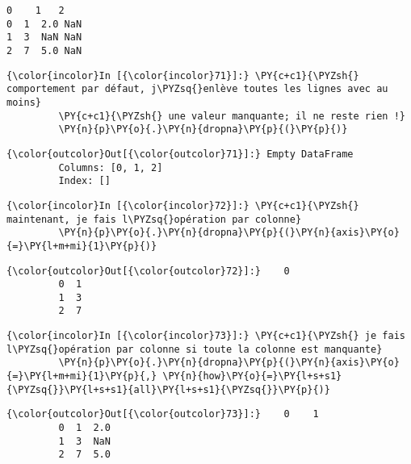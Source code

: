     \begin{Verbatim}[commandchars=\\\{\}]
   0    1   2
0  1  2.0 NaN
1  3  NaN NaN
2  7  5.0 NaN

    \end{Verbatim}

    \begin{Verbatim}[commandchars=\\\{\}]
{\color{incolor}In [{\color{incolor}71}]:} \PY{c+c1}{\PYZsh{} comportement par défaut, j\PYZsq{}enlève toutes les lignes avec au moins}
         \PY{c+c1}{\PYZsh{} une valeur manquante; il ne reste rien !}
         \PY{n}{p}\PY{o}{.}\PY{n}{dropna}\PY{p}{(}\PY{p}{)}
\end{Verbatim}


\begin{Verbatim}[commandchars=\\\{\}]
{\color{outcolor}Out[{\color{outcolor}71}]:} Empty DataFrame
         Columns: [0, 1, 2]
         Index: []
\end{Verbatim}
            
    \begin{Verbatim}[commandchars=\\\{\}]
{\color{incolor}In [{\color{incolor}72}]:} \PY{c+c1}{\PYZsh{} maintenant, je fais l\PYZsq{}opération par colonne}
         \PY{n}{p}\PY{o}{.}\PY{n}{dropna}\PY{p}{(}\PY{n}{axis}\PY{o}{=}\PY{l+m+mi}{1}\PY{p}{)}
\end{Verbatim}


\begin{Verbatim}[commandchars=\\\{\}]
{\color{outcolor}Out[{\color{outcolor}72}]:}    0
         0  1
         1  3
         2  7
\end{Verbatim}
            
    \begin{Verbatim}[commandchars=\\\{\}]
{\color{incolor}In [{\color{incolor}73}]:} \PY{c+c1}{\PYZsh{} je fais l\PYZsq{}opération par colonne si toute la colonne est manquante}
         \PY{n}{p}\PY{o}{.}\PY{n}{dropna}\PY{p}{(}\PY{n}{axis}\PY{o}{=}\PY{l+m+mi}{1}\PY{p}{,} \PY{n}{how}\PY{o}{=}\PY{l+s+s1}{\PYZsq{}}\PY{l+s+s1}{all}\PY{l+s+s1}{\PYZsq{}}\PY{p}{)}
\end{Verbatim}


\begin{Verbatim}[commandchars=\\\{\}]
{\color{outcolor}Out[{\color{outcolor}73}]:}    0    1
         0  1  2.0
         1  3  NaN
         2  7  5.0
\end{Verbatim}
            

